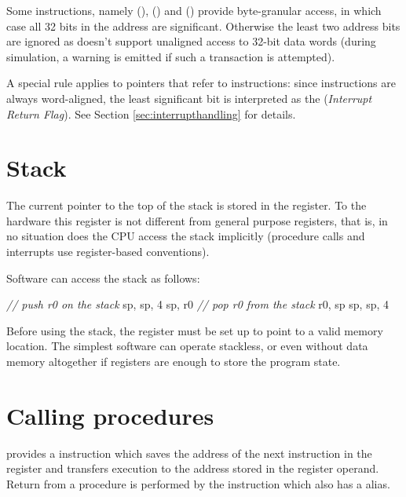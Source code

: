 \documentclass[a4paper,12pt,twoside,extrafontsizes]{memoir}
\begin{document}
Some instructions, namely  (),  () and  () provide byte-granular access, in which case all 32 bits in the address are significant. Otherwise the least two address bits are ignored as \lxp{} doesn't support unaligned access to 32-bit data words (during simulation, a warning is emitted if such a transaction is attempted).

A special rule applies to pointers that refer to instructions: since instructions are always word-aligned, the least significant bit is interpreted as the  (\emph{Interrupt Return Flag}). See Section \ref{sec:interrupthandling} for details.

\section{Stack}
\label{sec:stack}

The current pointer to the top of the stack is stored in the  register. To the hardware this register is not different from general purpose registers, that is, in no situation does the CPU access the stack implicitly (procedure calls and interrupts use register-based conventions).

Software can access the stack as follows:

\begin{codepar}
    \emph{// push r0 on the stack}
     sp, sp, 4
     sp, r0
    \emph{// pop r0 from the stack}
     r0, sp
     sp, sp, 4
\end{codepar}

Before using the stack, the  register must be set up to point to a valid memory location. The simplest software can operate stackless, or even without data memory altogether if registers are enough to store the program state.

\section{Calling procedures}
\label{sec:callingprocedures}

\lxp{} provides a  instruction which saves the address of the next instruction in the  register and transfers execution to the address stored in the register operand. Return from a procedure is performed by the  instruction which also has a  alias.
\end{document}
